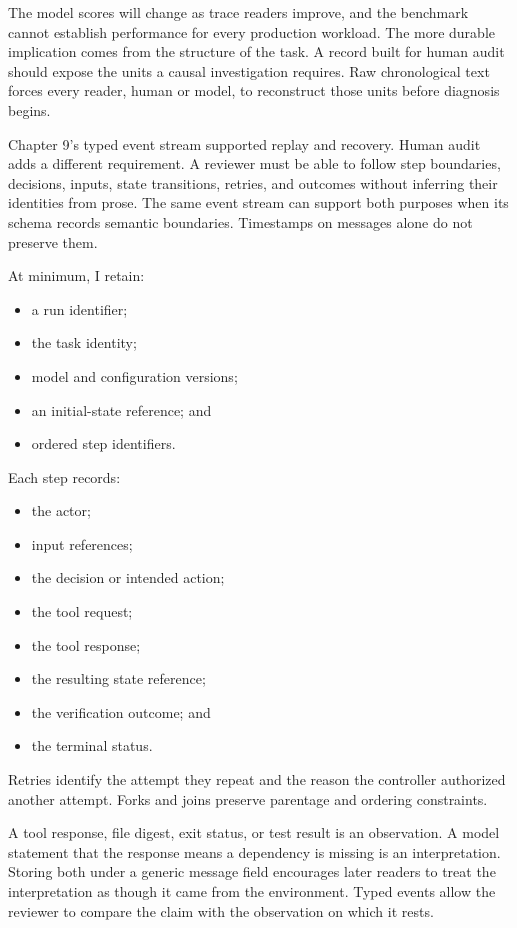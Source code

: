 The model scores will change as trace readers improve, and the benchmark cannot establish performance for every production workload. The more durable implication comes from the structure of the task. A record built for human audit should expose the units a causal investigation requires. Raw chronological text forces every reader, human or model, to reconstruct those units before diagnosis begins.

Chapter 9's typed event stream supported replay and recovery. Human audit adds a different requirement. A reviewer must be able to follow step boundaries, decisions, inputs, state transitions, retries, and outcomes without inferring their identities from prose. The same event stream can support both purposes when its schema records semantic boundaries. Timestamps on messages alone do not preserve them.

At minimum, I retain:

\begin{itemize}
\tightlist
\item
  a run identifier;
\item
  the task identity;
\item
  model and configuration versions;
\item
  an initial-state reference; and
\item
  ordered step identifiers.
\end{itemize}

Each step records:

\begin{itemize}
\tightlist
\item
  the actor;
\item
  input references;
\item
  the decision or intended action;
\item
  the tool request;
\item
  the tool response;
\item
  the resulting state reference;
\item
  the verification outcome; and
\item
  the terminal status.
\end{itemize}

Retries identify the attempt they repeat and the reason the controller authorized another attempt. Forks and joins preserve parentage and ordering constraints.

A tool response, file digest, exit status, or test result is an observation. A model statement that the response means a dependency is missing is an interpretation. Storing both under a generic message field encourages later readers to treat the interpretation as though it came from the environment. Typed events allow the reviewer to compare the claim with the observation on which it rests.

